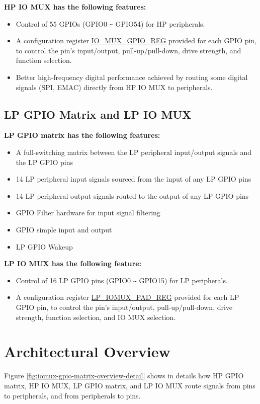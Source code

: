 \documentclass[main\_\_EN.tex]{subfiles}
\begin{document}
\textbf{HP IO MUX has the following features:}

\begin{itemize}
\item Control of 55 GPIOs (GPIO0 \verb+~+ GPIO54) for HP peripherals.
\item A configuration register \hyperref[regdesc:IOMUXGPIONREG]{IO\_MUX\_GPIO\_REG} provided for each GPIO pin, to control the pin's input/output, pull-up/pull-down, drive strength, and function selection.
\item Better high-frequency digital performance achieved by routing some digital signals (SPI, EMAC) directly from HP IO MUX to peripherals.

\end{itemize}
\subsection{LP GPIO Matrix and LP IO MUX}
\textbf{LP GPIO matrix has the following features:}

\begin{itemize}
\item A full-switching matrix between the LP peripheral input/output signals and the LP GPIO pins
\item 14 LP peripheral input signals sourced from the input of any LP GPIO pins
\item 14 LP peripheral output signals routed to the output of any LP GPIO pins
\item GPIO Filter hardware for input signal filtering
\item GPIO simple input and output
\item LP GPIO Wakeup
\end{itemize}

\textbf{LP IO MUX has the following feature:}

\begin{itemize}
    \item Control of 16 LP GPIO pins (GPIO0 \verb+~+ GPIO15) for LP peripherals.
    \item A configuration register \hyperref[regdesc:LPIOMUXPADNREG]{LP\_IOMUX\_PAD\_REG} provided for each LP GPIO pin, to control the pin's input/output, pull-up/pull-down, drive strength, function selection, and IO MUX selection.
\end{itemize}

\section{Architectural Overview}
Figure \ref{fig:iomux-gpio-matrix-overview-detail} shows in details how HP GPIO matrix, HP IO MUX, LP GPIO matrix, and LP IO MUX route signals from pins to peripherals, and from peripherals to pins.
\end{document}
